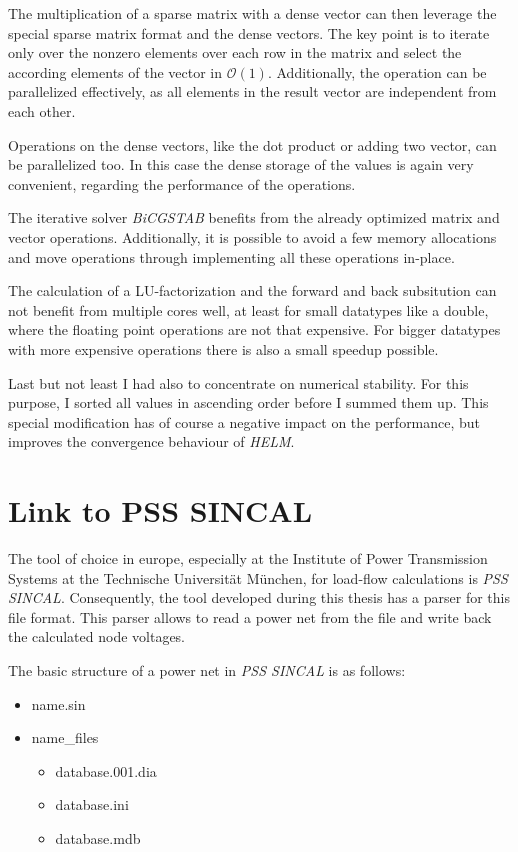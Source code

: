 The multiplication of a sparse matrix with a dense vector can then leverage the special sparse matrix format and the dense vectors. The key point is to iterate only over the nonzero elements over each row in the matrix and select the according elements of the vector in $\mathcal O(1)$. Additionally, the operation can be parallelized effectively, as all elements in the result vector are independent from each other.

Operations on the dense vectors, like the dot product or adding two vector, can be parallelized too. In this case the dense storage of the values is again very convenient, regarding the performance of the operations.

The iterative solver \emph{BiCGSTAB} benefits from the already optimized matrix and vector operations. Additionally, it is possible to avoid a few memory allocations and move operations through implementing all these operations in-place.

The calculation of a LU-factorization and the forward and back subsitution can not benefit from multiple cores well, at least for small datatypes like a double, where the floating point operations are not that expensive. For bigger datatypes with more expensive operations there is also a small speedup possible.

Last but not least I had also to concentrate on numerical stability. For this purpose, I sorted all values in ascending order before I summed them up. This special modification has of course a negative impact on the performance, but improves the convergence behaviour of \emph{HELM}.

\section{Link to PSS SINCAL}
\label{sec:link_sincal}
The tool of choice in europe, especially at the Institute of Power Transmission Systems at the Technische Universität München, for load-flow calculations is \emph{PSS SINCAL}. Consequently, the tool developed during this thesis has a parser for this file format. This parser allows to read a power net from the file and write back the calculated node voltages.

The basic structure of a power net in \emph{PSS SINCAL} is as follows:
\begin{itemize}
	\item {\textlangle}name{\textrangle}.sin
	\item {\textlangle}name{\textrangle\_}files
	\begin{itemize}
		\item database.001.dia
		\item database.ini
		\item database.mdb
	\end{itemize}
\end{itemize}

